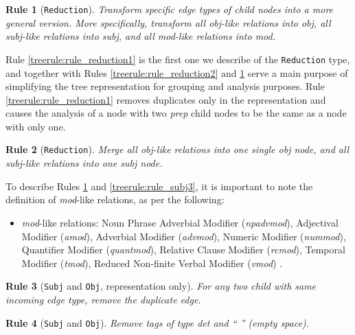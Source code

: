 \documentclass[11pt,a4paper,openright]{memoir}
\newtheorem{treerule}{Rule}
\begin{document}
\begin{treerule}[\texttt{Reduction}]
\label{treerule:rule_reduction3}
Transform specific edge types of child nodes into a more general version. More specifically, transform all \emph{obj}-like relations into \emph{obj}, all \emph{subj}-like relations into \emph{subj}, and all \emph{mod}-like relations into \emph{mod}.
\end{treerule}

Rule \ref{treerule:rule_reduction1} is the first one we describe of the \texttt{Reduction} type, and together with Rules  \ref{treerule:rule_reduction2} and \ref{treerule:rule_reduction3} serve a main purpose of simplifying the tree representation for grouping and analysis purposes. Rule \ref{treerule:rule_reduction1} removes duplicates only in the representation and causes the analysis of a node with two \emph{prep} child nodes to be the same as a node with only one.

\begin{treerule}[\texttt{Reduction}]
\label{treerule:rule_reduction4}
Merge all \emph{obj}-like relations into one single \emph{obj} node, and all \emph{subj}-like relations into one \emph{subj} node.
\end{treerule}

To describe Rules \ref{treerule:rule_reduction3} and \ref{treerule:rule_subj3}, it is important to note the definition of \emph{mod}-like relations, as per the following:
\begin{itemize}
  \item \emph{mod}-like relations: Noun Phrase Adverbial Modifier (\emph{npadvmod}), Adjectival Modifier (\emph{amod}), Adverbial Modifier (\emph{advmod}), Numeric Modifier (\emph{nummod}), Quantifier Modifier (\emph{quantmod}), Relative Clause Modifier (\emph{rcmod}), Temporal Modifier (\emph{tmod}), Reduced Non-finite Verbal Modifier (\emph{vmod}) \cite{Marneffe08stanfordtyped}.
\end{itemize}

\begin{treerule}[\texttt{Subj} and \texttt{Obj}, representation only]
\label{treerule:rule_subj1}
For any two child with same incoming edge type, remove the duplicate edge.
\end{treerule}

\begin{treerule}[\texttt{Subj} and \texttt{Obj}]
\label{treerule:rule_subj2}
Remove tags of type \emph{det} and \emph{\enquote{ }} (empty space).
\end{treerule}
\end{document}
